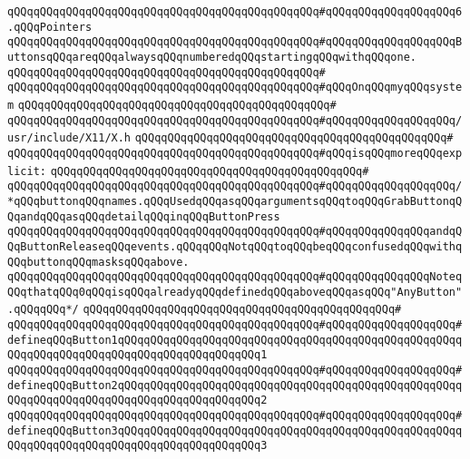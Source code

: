 \verb|qQQqqQQqqQQqqQQqqQQqqQQqqQQqqQQqqQQqqQQqqQQqqQQq#qQQqqQQqqQQqqQQqqQQq6.qQQqPointers|\newline
\verb|qQQqqQQqqQQqqQQqqQQqqQQqqQQqqQQqqQQqqQQqqQQqqQQq#qQQqqQQqqQQqqQQqqQQqButtonsqQQqareqQQqalwaysqQQqnumberedqQQqstartingqQQqwithqQQqone.|\newline
\verb|qQQqqQQqqQQqqQQqqQQqqQQqqQQqqQQqqQQqqQQqqQQqqQQq#|\newline
\verb|qQQqqQQqqQQqqQQqqQQqqQQqqQQqqQQqqQQqqQQqqQQqqQQq#qQQqOnqQQqmyqQQqsystem|\newline
\verb|qQQqqQQqqQQqqQQqqQQqqQQqqQQqqQQqqQQqqQQqqQQqqQQq#|\newline
\verb|qQQqqQQqqQQqqQQqqQQqqQQqqQQqqQQqqQQqqQQqqQQqqQQq#qQQqqQQqqQQqqQQqqQQq/usr/include/X11/X.h|\newline
\verb|qQQqqQQqqQQqqQQqqQQqqQQqqQQqqQQqqQQqqQQqqQQqqQQq#|\newline
\verb|qQQqqQQqqQQqqQQqqQQqqQQqqQQqqQQqqQQqqQQqqQQqqQQq#qQQqisqQQqmoreqQQqexplicit:|\newline
\verb|qQQqqQQqqQQqqQQqqQQqqQQqqQQqqQQqqQQqqQQqqQQqqQQq#|\newline
\verb|qQQqqQQqqQQqqQQqqQQqqQQqqQQqqQQqqQQqqQQqqQQqqQQq#qQQqqQQqqQQqqQQqqQQq/*qQQqbuttonqQQqnames.qQQqUsedqQQqasqQQqargumentsqQQqtoqQQqGrabButtonqQQqandqQQqasqQQqdetailqQQqinqQQqButtonPress|\newline
\verb|qQQqqQQqqQQqqQQqqQQqqQQqqQQqqQQqqQQqqQQqqQQqqQQq#qQQqqQQqqQQqqQQqandqQQqButtonReleaseqQQqevents.qQQqqQQqNotqQQqtoqQQqbeqQQqconfusedqQQqwithqQQqbuttonqQQqmasksqQQqabove.|\newline
\verb|qQQqqQQqqQQqqQQqqQQqqQQqqQQqqQQqqQQqqQQqqQQqqQQq#qQQqqQQqqQQqqQQqNoteqQQqthatqQQq0qQQqisqQQqalreadyqQQqdefinedqQQqaboveqQQqasqQQq"AnyButton".qQQqqQQq*/|\newline
\verb|qQQqqQQqqQQqqQQqqQQqqQQqqQQqqQQqqQQqqQQqqQQqqQQq#|\newline
\verb|qQQqqQQqqQQqqQQqqQQqqQQqqQQqqQQqqQQqqQQqqQQqqQQq#qQQqqQQqqQQqqQQqqQQq#defineqQQqButton1qQQqqQQqqQQqqQQqqQQqqQQqqQQqqQQqqQQqqQQqqQQqqQQqqQQqqQQqqQQqqQQqqQQqqQQqqQQqqQQqqQQqqQQqqQQq1|\newline
\verb|qQQqqQQqqQQqqQQqqQQqqQQqqQQqqQQqqQQqqQQqqQQqqQQq#qQQqqQQqqQQqqQQqqQQq#defineqQQqButton2qQQqqQQqqQQqqQQqqQQqqQQqqQQqqQQqqQQqqQQqqQQqqQQqqQQqqQQqqQQqqQQqqQQqqQQqqQQqqQQqqQQqqQQqqQQq2|\newline
\verb|qQQqqQQqqQQqqQQqqQQqqQQqqQQqqQQqqQQqqQQqqQQqqQQq#qQQqqQQqqQQqqQQqqQQq#defineqQQqButton3qQQqqQQqqQQqqQQqqQQqqQQqqQQqqQQqqQQqqQQqqQQqqQQqqQQqqQQqqQQqqQQqqQQqqQQqqQQqqQQqqQQqqQQqqQQq3|\newline
